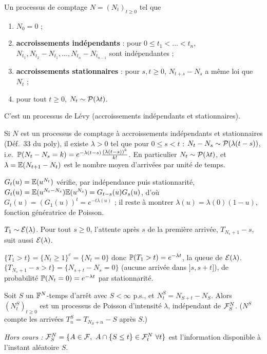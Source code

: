 \documentclass[11pt,a4paper]{article}
\begin{document}
\begin{definition}\label{C9:def}
Un processus de comptage $N=(N_t)_{t\ge0}$ tel que
\begin{enumerate}
  \item $N_0=0$ ;
  \item \textbf{accroissements indépendants} : pour $0\le t_1<\dots<t_n$, $N_{t_1},N_{t_2}-N_{t_1},\dots,N_{t_n}-N_{t_{n-1}}$ sont indépendantes ;
  \item \textbf{accroissements stationnaires} : pour $s,t\ge0$, $N_{t+s}-N_s$ a même loi que $N_t$ ;
  \item pour tout $t\ge0$, $N_t\sim\mathcal{P}(\lambda t)$.
\end{enumerate}
C'est un processus de Lévy (accroissements indépendants et stationnaires).
\end{definition}

\begin{theoreme}\label{C9:thm34}
Si $N$ est un processus de comptage à accroissements indépendants et stationnaires (Déf.~33 du poly), il existe $\lambda>0$ tel que
pour $0\le s<t$ : $N_t-N_s\sim\mathcal{P}(\lambda(t-s))$, i.e.\ $\mathbb{P}(N_t-N_s=k)=e^{-\lambda(t-s)}\frac{(\lambda(t-s))^k}{k!}$.
En particulier $N_t\sim\mathcal{P}(\lambda t)$, et $\lambda=\mathbb{E}(N_{t+1}-N_t)$ est le nombre moyen d'arrivées par unité de temps.
\end{theoreme}
\begin{idee}
$G_t(u)=\mathbb{E}(u^{N_t})$ vérifie, par indépendance puis stationnarité, $G_t(u)=\mathbb{E}(u^{N_t-N_s})\mathbb{E}(u^{N_s})=G_{t-s}(u)G_s(u)$,
d'où $G_t(u)=(G_1(u))^t=e^{-t\lambda(u)}$ ; il reste à montrer $\lambda(u)=\lambda(0)(1-u)$, fonction génératrice de Poisson.
\end{idee}

\begin{theoreme}\label{C9:T1}
$T_1\sim\mathcal{E}(\lambda)$. Pour tout $s\ge0$, l'attente après $s$ de la première arrivée, $T_{N_s+1}-s$, suit aussi $\mathcal{E}(\lambda)$.
\end{theoreme}
\begin{idee}
$\{T_1>t\}=\{N_t\ge1\}^c=\{N_t=0\}$ donc $\mathbb{P}(T_1>t)=e^{-\lambda t}$, la queue de $\mathcal{E}(\lambda)$.
$\{T_{N_s+1}-s>t\}=\{N_{s+t}-N_s=0\}$ (aucune arrivée dans $]s,s+t]$), de probabilité $\mathbb{P}(N_t=0)=e^{-\lambda t}$ par stationnarité.
\end{idee}

\begin{theoreme}\label{C9:markov}
Soit $S$ un $\mathbb{F}^N$-temps d'arrêt avec $S<\infty$ p.s., et $N^S_t=N_{S+t}-N_S$. Alors $(N^S_t)_{t\ge0}$ est un processus de Poisson
d'intensité $\lambda$, indépendant de $\mathcal{F}^N_S$. ($N^S$ compte les arrivées $T^S_n=T_{N_S+n}-S$ après $S$.)
\end{theoreme}
\begin{remarque}
\emph{Hors cours :} $\F^N_S=\{A\in\F,\ A\cap\{S\le t\}\in\F^N_t\ \forall t\}$ est l'information disponible à l'instant aléatoire $S$.
\end{remarque}
\end{document}
